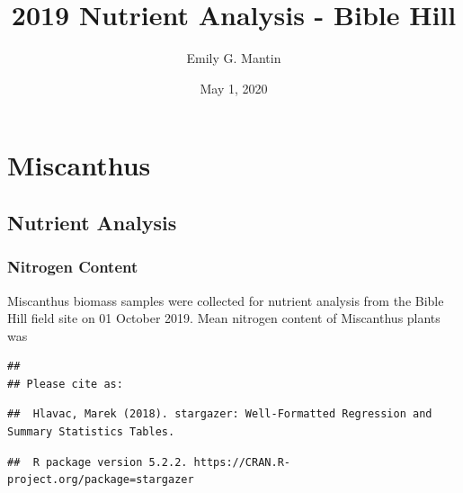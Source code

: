 \documentclass[]{article}
\title{2019 Nutrient Analysis - Bible Hill}
\author{Emily G. Mantin}
\date{May 1, 2020}
\begin{document}
\maketitle

{
\setcounter{tocdepth}{2}
\tableofcontents
}
\section{Miscanthus}\label{miscanthus}

\subsection{Nutrient Analysis}\label{nutrient-analysis}

\subsubsection{Nitrogen Content}\label{nitrogen-content}

Miscanthus biomass samples were collected for nutrient analysis from the
Bible Hill field site on 01 October 2019. Mean nitrogen content of
Miscanthus plants was

\begin{verbatim}
## 
## Please cite as:
\end{verbatim}

\begin{verbatim}
##  Hlavac, Marek (2018). stargazer: Well-Formatted Regression and Summary Statistics Tables.
\end{verbatim}

\begin{verbatim}
##  R package version 5.2.2. https://CRAN.R-project.org/package=stargazer
\end{verbatim}
\end{document}
